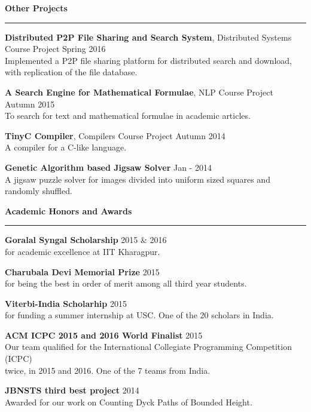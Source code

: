 \documentclass[10pt]{article}
\newcommand{\heading}[1]{
 {\large \textbf{#1}}
  \vspace{0.4em}
  \hrule
  \vspace{0.4em}
}
\newcommand{\EntryGap}{\vspace{0.5cm}}
\newcommand{\SmallEntryGap}{\vspace{0.2cm}}
\begin{document}
\heading{Other Projects}
  \SmallEntryGap
  
  \textbf{Distributed P2P File Sharing and Search System}, Distributed Systems Course Project \hfill Spring 2016\\
  Implemented a P2P file sharing platform for distributed search and download,\\
  with replication of the file database.
  \SmallEntryGap
  
  \textbf{A Search Engine for Mathematical Formulae}, NLP Course Project \hfill Autumn 2015\\
  To search for text and mathematical formulae in academic articles.
  \SmallEntryGap
  
  \textbf{TinyC Compiler}, Compilers Course Project \hfill Autumn 2014\\
  A compiler for a C-like language.
  \SmallEntryGap
  
  \textbf{Genetic Algorithm based Jigsaw Solver} \hfill Jan - 2014\\
  A jigsaw puzzle solver for images divided into uniform sized squares and randomly shuffled.




\EntryGap
\heading{Academic Honors and Awards}
 \SmallEntryGap
 
 \textbf{Goralal Syngal Scholarship} \hfill 2015 \& 2016\\
 for academic excellence at IIT Kharagpur.
 \SmallEntryGap
 
 \textbf{Charubala Devi Memorial Prize} \hfill 2015\\
  for being the best in order of merit among all third year students.
  \SmallEntryGap
  
 \textbf{Viterbi-India Scholarhip} \hfill 2015\\
  for funding a summer internship at USC. One of the 20 scholars in India.
  \SmallEntryGap
  
 \textbf{ACM ICPC 2015 and 2016 World Finalist} \hfill 2015\\
  Our team qualified for the International Collegiate Programming Competition (ICPC)\\
  twice, in 2015 and 2016. One of the 7 teams from India.
  \SmallEntryGap
  
 \textbf{JBNSTS third best project} \hfill 2014\\
  Awarded for our work on Counting Dyck Paths of Bounded Height.
  \SmallEntryGap
  
\end{document}
